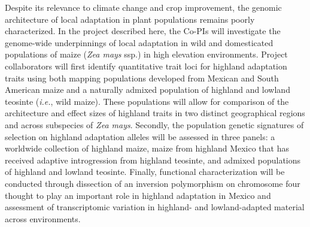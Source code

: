 

%
%
%
%
%
%


Despite its relevance to climate change and crop improvement, the genomic architecture of local adaptation in plant populations remains poorly characterized.  In the project described here, the Co-PIs will investigate the genome-wide underpinnings of local adaptation in wild and domesticated populations of maize (\emph{Zea mays} ssp.) in high elevation environments.  Project collaborators will first identify quantitative trait loci for highland adaptation traits using both mapping populations developed from Mexican and South American maize and a naturally admixed population of highland and lowland teosinte (\emph{i.e.}, wild maize).  These populations will allow for comparison of the architecture and effect sizes of highland traits in two distinct geographical regions and across subspecies of \emph{Zea mays}.  Secondly, the population genetic signatures of selection on highland adaptation alleles will be assessed in three panels: a worldwide collection of highland maize, maize from highland Mexico that has received adaptive introgression from highland teosinte, and admixed populations of highland and lowland teosinte.  Finally, functional characterization will be conducted through dissection of an inversion polymorphism on chromosome four thought to play an important role in highland adaptation in Mexico and assessment of transcriptomic variation in highland- and lowland-adapted material across environments.

